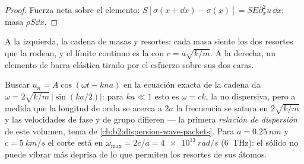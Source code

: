 \begin{proof}
Fuerza neta sobre el elemento: $S[\sigma(x + \dd x) - \sigma(x)] = SE\partial_x^2u\,\dd x$;
masa $\rho S\dd x$.
\end{proof}

\begin{omfigure}

{\small A la izquierda, la cadena de masas y resortes: cada masa siente
los dos resortes que la rodean, y el límite continuo es la 
con $c = a\sqrt{k/m}$. A la derecha, un elemento de barra elástica tirado
por el esfuerzo sobre sus dos caras.}
\end{omfigure}

\begin{remark}\label{rem:b2:waves-on-strings:dispersion}
Buscar $u_n = A\cos(\omega t - kna)$ en la ecuación exacta de la cadena da
$\omega = 2\sqrt{k/m}\,|\sin(ka/2)|$: para $ka \ll 1$ esto es $\omega = ck$, la
 no dispersiva, pero a medida que la longitud de onda se acerca a $2a$ la
frecuencia se satura en $2\sqrt{k/m}$ y las velocidades de fase y de grupo
difieren --- la primera \emph{relación de dispersión} de este volumen,
tema de \cref{ch:b2:dispersion-wave-packets}. Para $a = \qty{0.25}{nm}$ y
$c = \qty{5}{km/s}$ el corte está en $\omega_{\max} = 2c/a = \qty{4e13}{rad/s}$
(\qty{6}{THz}): el sólido no puede vibrar más deprisa de lo que permiten
los resortes de sus átomos.
\end{remark}

